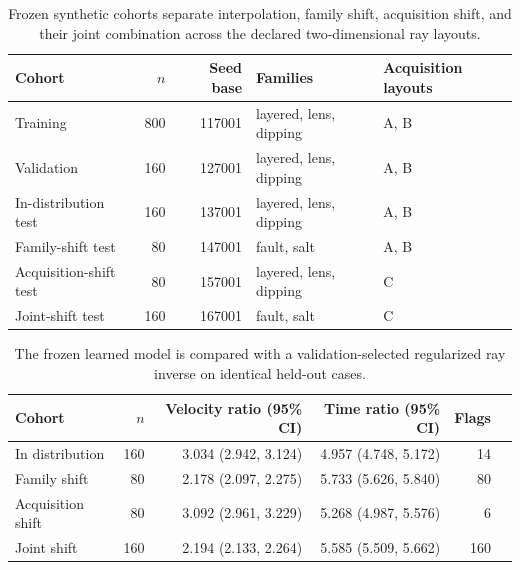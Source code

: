 \begin{table}[htbp]
\centering
\small
\caption{Frozen synthetic cohorts separate interpolation, family shift, acquisition shift, and their joint combination across the declared two-dimensional ray layouts.}
\label{tab:cohorts}
\begin{tabular}{lrrll}
\toprule
Cohort & $n$ & Seed base & Families & Acquisition layouts \\
\midrule
Training & 800 & 117001 & layered, lens, dipping & A, B \\
Validation & 160 & 127001 & layered, lens, dipping & A, B \\
In-distribution test & 160 & 137001 & layered, lens, dipping & A, B \\
Family-shift test & 80 & 147001 & fault, salt & A, B \\
Acquisition-shift test & 80 & 157001 & layered, lens, dipping & C \\
Joint-shift test & 160 & 167001 & fault, salt & C \\
\bottomrule
\end{tabular}
\end{table}

\begin{table}[htbp]
\centering
\small
\caption{The frozen learned model is compared with a validation-selected regularized ray inverse on identical held-out cases.}
\label{tab:primary}
\begin{tabular}{lrrrrr}
\toprule
Cohort & $n$ & Velocity ratio (95\% CI) & Time ratio (95\% CI) & Flags \\
\midrule
In distribution & 160 & 3.034 (2.942, 3.124) & 4.957 (4.748, 5.172) & 14 \\
Family shift & 80 & 2.178 (2.097, 2.275) & 5.733 (5.626, 5.840) & 80 \\
Acquisition shift & 80 & 3.092 (2.961, 3.229) & 5.268 (4.987, 5.576) & 6 \\
Joint shift & 160 & 2.194 (2.133, 2.264) & 5.585 (5.509, 5.662) & 160 \\
\bottomrule
\end{tabular}
\end{table}

